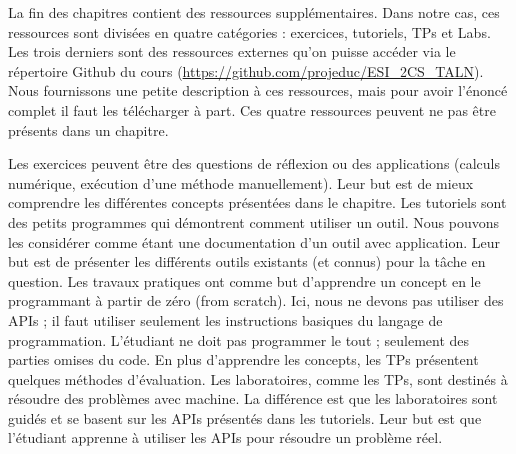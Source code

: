 \documentclass{KodeBook}
\begin{document}
La fin des chapitres contient des ressources supplémentaires.
Dans notre cas, ces ressources sont divisées en quatre catégories : exercices, tutoriels, TPs et Labs.
Les trois derniers sont des ressources externes qu'on puisse accéder via le répertoire Github du cours (\url{https://github.com/projeduc/ESI_2CS_TALN}).
Nous fournissons une petite description à ces ressources, mais pour avoir l'énoncé complet il faut les télécharger à part.
Ces quatre ressources peuvent ne pas être présents dans un chapitre.

Les exercices peuvent être des questions de réflexion ou des applications (calculs numérique, exécution d'une méthode manuellement).
Leur but est de mieux comprendre les différentes concepts présentées dans le chapitre.
Les tutoriels sont des petits programmes qui démontrent comment utiliser un outil.
Nous pouvons les considérer comme étant une documentation d'un outil avec application.
Leur but est de présenter les différents outils existants (et connus) pour la tâche en question.
Les travaux pratiques ont comme but d'apprendre un concept en le programmant à partir de zéro (from scratch).
Ici, nous ne devons pas utiliser des APIs ; il faut utiliser seulement les instructions basiques du langage de programmation.
L'étudiant ne doit pas programmer le tout ; seulement des parties omises du code.
En plus d'apprendre les concepts, les TPs présentent quelques méthodes d'évaluation.
Les laboratoires, comme les TPs, sont destinés à résoudre des problèmes avec machine.
La différence est que les laboratoires sont guidés et se basent sur les APIs présentés dans les tutoriels.
Leur but est que l'étudiant apprenne à utiliser les APIs pour résoudre un problème réel.


\ifx\wholebook\relax\else
% 
% 
	
\end{document}
